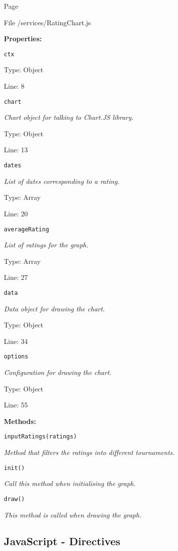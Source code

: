 Page \pageref{RatingChart.js}

File /services/RatingChart.js

\textbf{Properties:}

\texttt{ctx}

{\scriptsize
\textit{}

Type: Object

Line: 8

}
\texttt{chart}

{\scriptsize
\textit{Chart object for talking to Chart.JS library.}

Type: Object

Line: 13

}
\texttt{dates}

{\scriptsize
\textit{List of dates corresponding to a rating.}

Type: Array

Line: 20

}
\texttt{averageRating}

{\scriptsize
\textit{List of ratings for the graph.}

Type: Array

Line: 27

}
\texttt{data}

{\scriptsize
\textit{Data object for drawing the chart.}

Type: Object

Line: 34

}
\texttt{options}

{\scriptsize
\textit{Configuration for drawing the chart.}

Type: Object

Line: 55

}
\textbf{Methods:}

\texttt{inputRatings(ratings)}

{\scriptsize
\textit{Method that filters the ratings into different tournaments.}

}

\texttt{init()}

{\scriptsize
\textit{Call this method when initialising the graph.}

}

\texttt{draw()}

{\scriptsize
\textit{This method is called when drawing the graph.}

}

\subsection{JavaScript - Directives}
